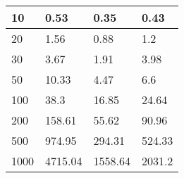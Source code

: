 \begin{table}[H]
\begin{tabular}{||l|lll||}
    10         & 0.53                                                  & 0.35                                              & 0.43                                            \\ \hline
    20         & 1.56                                                  & 0.88                                              & 1.2                                             \\ \hline
    30         & 3.67                                                  & 1.91                                              & 3.98                                            \\ \hline
    50         & 10.33                                                 & 4.47                                              & 6.6                                             \\ \hline
    100        & 38.3                                                  & 16.85                                             & 24.64                                           \\ \hline
    200        & 158.61                                                & 55.62                                             & 90.96                                           \\ \hline
    500        & 974.95                                                & 294.31                                            & 524.33                                          \\ \hline
    1000       & 4715.04                                               & 1558.64                                           & 2031.2                                          \\ \hline
    \end{tabular}
    \label{tbl:time}
    \end{table}

